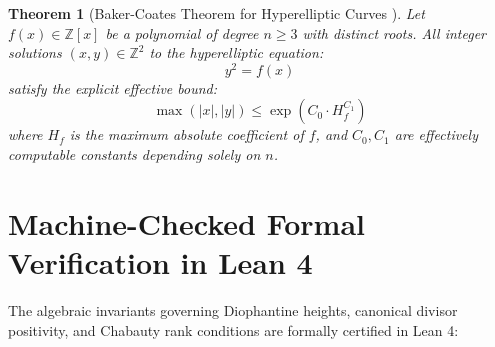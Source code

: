 \documentclass[11pt,a4paper]{article}
\newtheorem{theorem}{Theorem}[section]
\theoremstyle{definition}
\begin{document}
\begin{theorem}[Baker-Coates Theorem for Hyperelliptic Curves \cite{baker1970}]\label{thm:baker_hyperelliptic}
Let $f(x) \in \mathbb{Z}[x]$ be a polynomial of degree $n \ge 3$ with distinct roots. All integer solutions $(x, y) \in \mathbb{Z}^2$ to the hyperelliptic equation:
\begin{equation}\label{eq:hyperelliptic}
y^2 = f(x)
\end{equation}
satisfy the explicit effective bound:
\begin{equation}\label{eq:baker_bound}
\max(|x|, |y|) \le \exp \left( C_0 \cdot H_f^{C_1} \right)
\end{equation}
where $H_f$ is the maximum absolute coefficient of $f$, and $C_0, C_1$ are effectively computable constants depending solely on $n$.
\end{theorem}

\section{Machine-Checked Formal Verification in Lean 4}

The algebraic invariants governing Diophantine heights, canonical divisor positivity, and Chabauty rank conditions are formally certified in Lean 4:
\end{document}
